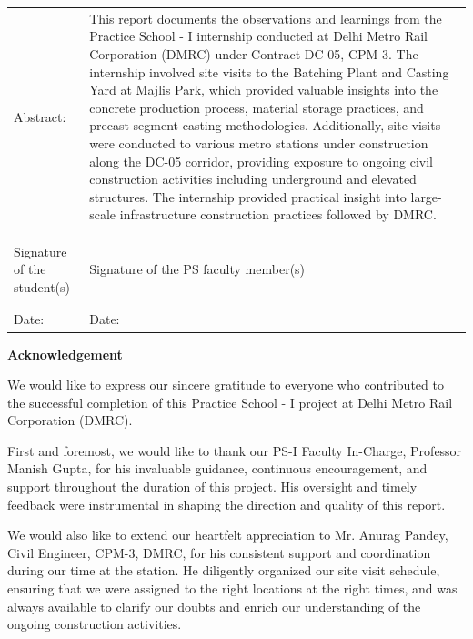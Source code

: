 \documentclass{book}
\begin{document}
{\bf
	\begin{tabular}{p{7cm}p{6cm}}
		Abstract: & This report documents the observations and learnings from the Practice School - I internship conducted at Delhi Metro Rail Corporation (DMRC) under Contract DC-05, CPM-3. The internship involved site visits to the Batching Plant and Casting Yard at Majlis Park, which provided valuable insights into the concrete production process, material storage practices, and precast segment casting methodologies. Additionally, site visits were conducted to various metro stations under construction along the DC-05 corridor, providing exposure to ongoing civil construction activities including underground and elevated structures. The internship provided practical insight into large-scale infrastructure construction practices followed by DMRC. \\
		& \\
		& \\
		& \\
		Signature of the student(s) & Signature of the PS faculty member(s) \\
		& \\
		& \\
		Date: & Date: \\
	\end{tabular}}

	\newpage
	\centerline{\bf \Large Acknowledgement}
\vspace*{0.5cm}

\par\noindent
We would like to express our sincere gratitude to everyone who contributed to the successful completion of this Practice School - I project at Delhi Metro Rail Corporation (DMRC).

\par\noindent
First and foremost, we would like to thank our PS-I Faculty In-Charge, Professor Manish Gupta, for his invaluable guidance, continuous encouragement, and support throughout the duration of this project. His oversight and timely feedback were instrumental in shaping the direction and quality of this report.

\par\noindent
We would also like to extend our heartfelt appreciation to Mr. Anurag Pandey, Civil Engineer, CPM-3, DMRC, for his consistent support and coordination during our time at the station. He diligently organized our site visit schedule, ensuring that we were assigned to the right locations at the right times, and was always available to clarify our doubts and enrich our understanding of the ongoing construction activities.
\end{document}

